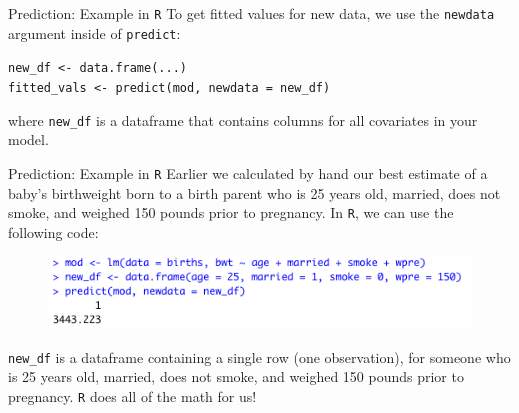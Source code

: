 \documentclass[10pt,t]{beamer}
\begin{document}
\begin{frame}{Prediction: Example in \texttt{R}}
To get fitted values for new data, we use the \texttt{newdata} argument inside of \texttt{predict}:

\vspace{0.3cm}

\texttt{new\_df <- data.frame(...)} \\
\texttt{fitted\_vals <- predict(mod, newdata = new\_df)}

\vspace{0.3cm}

where \texttt{new\_df} is a dataframe that contains columns for all covariates in your model.

\end{frame}

\begin{frame}{Prediction: Example in \texttt{R}}
Earlier we calculated by hand our best estimate of a baby's birthweight born to a birth parent who is 25 years old, married, does not smoke, and weighed 150 pounds prior to pregnancy. In \texttt{R}, we can use the following code:

\vspace{0.3cm}

\begin{figure}
	\centering \includegraphics[scale=0.5]{figures/newdata_example.png}
\end{figure}

\vspace{0.3cm}

\texttt{new\_df} is a dataframe containing a single row (one observation), for someone who is 25 years old, married, does not smoke, and weighed 150 pounds prior to pregnancy. \texttt{R} does all of the math for us!

\end{frame}
\end{document}
